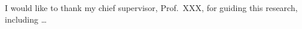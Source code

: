 \begin{acknowledgements}

I would like to thank my chief supervisor, Prof.~XXX, for guiding this
research, including \ldots

\end{acknowledgements}
